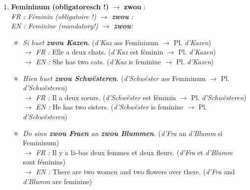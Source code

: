 \begin{itemize}
\begin{enumerate}
        \item \textbf{Femininum (obligatoresch !)} $\rightarrow$ \textbf{zwou} : \\
        \textit{FR : Féminin (obligatoire !) $\rightarrow$ \textbf{zwou} :} \\
        \textit{EN : Feminine (mandatory!) $\rightarrow$ \textbf{zwou}:}
        \begin{itemize}
            \item \textit{Si huet \textbf{zwou Kazen}.} (\textit{d'Kaz} ass Femininum $\rightarrow$ Pl. \textit{d'Kazen}) \\
            $\rightarrow$ \textit{FR :} Elle a deux chats. (\textit{d'Kaz} est féminin $\rightarrow$ Pl. \textit{d'Kazen}) \\
            $\rightarrow$ \textit{EN :} She has two cats. (\textit{d'Kaz} is feminine $\rightarrow$ Pl. \textit{d'Kazen})
            \item \textit{Hien huet \textbf{zwou Schwësteren}.} (\textit{d'Schwëster} ass Femininum $\rightarrow$ Pl. \textit{d'Schwësteren}) \\
            $\rightarrow$ \textit{FR :} Il a deux sœurs. (\textit{d'Schwëster} est féminin $\rightarrow$ Pl. \textit{d'Schwësteren}) \\
            $\rightarrow$ \textit{EN :} He has two sisters. (\textit{d'Schwëster} is feminine $\rightarrow$ Pl. \textit{d'Schwësteren})
            \item \textit{Do sinn \textbf{zwou Fraen} an \textbf{zwou Blummen}.} (\textit{d'Fra} an \textit{d'Blumm} si Femininum) \\
            $\rightarrow$ \textit{FR :} Il y a là-bas deux femmes et deux fleurs. (\textit{d'Fra} et \textit{d'Blumm} sont féminins) \\
            $\rightarrow$ \textit{EN :} There are two women and two flowers over there. (\textit{d'Fra} and \textit{d'Blumm} are feminine)
        \end{itemize}
    \end{enumerate}

    \vspace{0.3em}


\end{itemize}
